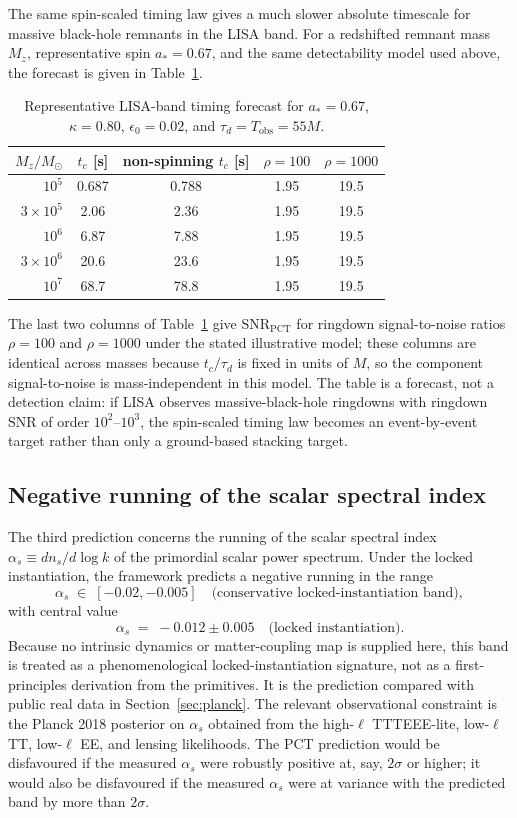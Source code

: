 ﻿\documentclass[12pt,a4paper]{article}
\theoremstyle{definition}
\begin{document}
The same spin-scaled timing law gives a much slower absolute timescale for massive black-hole remnants in the LISA band. For a redshifted remnant mass $M_z$, representative spin $a_\ast=0.67$, and the same detectability model used above, the forecast is given in Table~\ref{tab:lisa_forecast}.
\begin{table}[htbp]
\centering
\caption{Representative LISA-band timing forecast for $a_\ast=0.67$, $\kappa=0.80$, $\epsilon_0=0.02$, and $\tau_d=T_{\mathrm{obs}}=55M$.}
\label{tab:lisa_forecast}
\begin{tabular}{@{}rcccc@{}}
\toprule
$M_z/M_\odot$ & $t_c$ [s] & non-spinning $t_c$ [s] & $\rho=100$ & $\rho=1000$ \\
\midrule
$10^5$ & 0.687 & 0.788 & 1.95 & 19.5 \\
$3\times10^5$ & 2.06 & 2.36 & 1.95 & 19.5 \\
$10^6$ & 6.87 & 7.88 & 1.95 & 19.5 \\
$3\times10^6$ & 20.6 & 23.6 & 1.95 & 19.5 \\
$10^7$ & 68.7 & 78.8 & 1.95 & 19.5 \\
\bottomrule
\end{tabular}
\end{table}
The last two columns of Table~\ref{tab:lisa_forecast} give $\mathrm{SNR}_{\mathrm{PCT}}$ for ringdown signal-to-noise ratios $\rho=100$ and $\rho=1000$ under the stated illustrative model; these columns are identical across masses because $t_c/\tau_d$ is fixed in units of $M$, so the component signal-to-noise is mass-independent in this model. The table is a forecast, not a detection claim: if LISA observes massive-black-hole ringdowns with ringdown SNR of order $10^2$--$10^3$, the spin-scaled timing law becomes an event-by-event target rather than only a ground-based stacking target.

\subsection{Negative running of the scalar spectral index}
\label{sec:pred_alpha_s}

The third prediction concerns the running of the scalar spectral index $\alpha_s \equiv d n_s / d \log k$ of the primordial scalar power spectrum. Under the locked instantiation, the framework predicts a negative running in the range
\[
\alpha_s \;\in\; [-0.02,-0.005] \quad \text{(conservative locked-instantiation band)},
\]
with central value
\[
\alpha_s \;=\; -0.012 \pm 0.005 \quad \text{(locked instantiation)}.
\]
Because no intrinsic dynamics or matter-coupling map is supplied here, this band is treated as a phenomenological locked-instantiation signature, not as a first-principles derivation from the primitives. It is the prediction compared with public real data in Section~\ref{sec:planck}. The relevant observational constraint is the Planck 2018 posterior on $\alpha_s$ obtained from the high-$\ell$ TTTEEE-lite, low-$\ell$ TT, low-$\ell$ EE, and lensing likelihoods. The PCT prediction would be disfavoured if the measured $\alpha_s$ were robustly positive at, say, $2\sigma$ or higher; it would also be disfavoured if the measured $\alpha_s$ were at variance with the predicted band by more than $2\sigma$.
\end{document}
